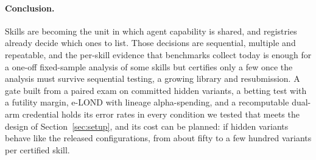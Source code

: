 \paragraph{Conclusion.} Skills are becoming the unit in which agent capability is shared, and registries already decide which ones to list. Those decisions are sequential, multiple and repeatable, and the per-skill evidence that benchmarks collect today is enough for a one-off fixed-sample analysis of some skills but certifies only a few once the analysis must survive sequential testing, a growing library and resubmission. A gate built from a paired exam on committed hidden variants, a betting test with a futility margin, e-LOND with lineage alpha-spending, and a recomputable dual-arm credential holds its error rates in every condition we tested that meets the design of Section~\ref{sec:setup}, and its cost can be planned: if hidden variants behave like the released configurations, from about fifty to a few hundred variants per certified skill.

